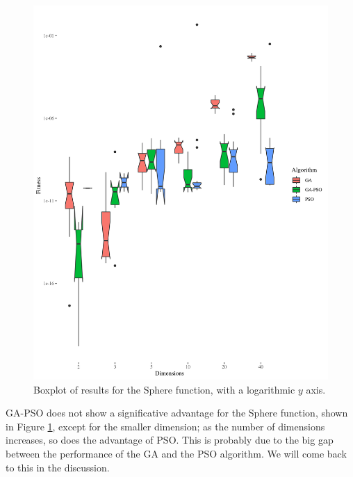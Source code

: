 \documentclass[runningheads]{llncs}
\begin{document}
\begin{figure}[h!tb]
  \centering
  \includegraphics[height=0.4\textheight]{img/sphere-boxplot.png}
  \caption{Boxplot of results for the Sphere function, with a logarithmic $y$ axis.\label{fig:boxplot:sphere}}
\end{figure}
%
GA-PSO does not show a significative advantage for the Sphere
function, shown in Figure \ref{fig:boxplot:sphere}, except for the
smaller dimension; as the number of dimensions increases, so does the
advantage of PSO. This is probably due to the big gap between the
performance of the GA and the PSO algorithm. We will come back to this
in the discussion.
\end{document}
